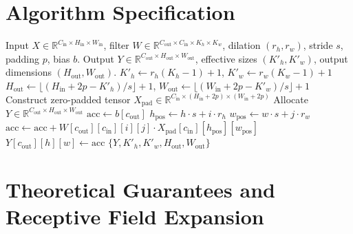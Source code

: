 \documentclass[11pt,a4paper]{article}
\theoremstyle{definition}
\begin{document}
\section{Algorithm Specification}

\begin{algorithm}[H]
\caption{Dilated (Atrous) 2D Convolution Forward Pass}
\label{alg:dilated_conv}
\begin{algorithmic}[1]
\Require Input $X \in \mathbb{R}^{C_{\text{in}} \times H_{\text{in}} \times W_{\text{in}}}$, filter $W \in \mathbb{R}^{C_{\text{out}} \times C_{\text{in}} \times K_h \times K_w}$, dilation $(r_h, r_w)$, stride $s$, padding $p$, bias $b$.
\Ensure Output $Y \in \mathbb{R}^{C_{\text{out}} \times H_{\text{out}} \times W_{\text{out}}}$, effective sizes $(K'_h, K'_w)$, output dimensions $(H_{\text{out}}, W_{\text{out}})$.
\State $K'_h \gets r_h(K_h - 1) + 1$, $K'_w \gets r_w(K_w - 1) + 1$
\State $H_{\text{out}} \gets \lfloor (H_{\text{in}} + 2p - K'_h) / s \rfloor + 1$, $W_{\text{out}} \gets \lfloor (W_{\text{in}} + 2p - K'_w) / s \rfloor + 1$
\State Construct zero-padded tensor $X_{\text{pad}} \in \mathbb{R}^{C_{\text{in}} \times (H_{\text{in}}+2p) \times (W_{\text{in}}+2p)}$
\State Allocate $Y \in \mathbb{R}^{C_{\text{out}} \times H_{\text{out}} \times W_{\text{out}}}$
            \State $\text{acc} \gets b[c_{\text{out}}]$
                    \State $h_{\text{pos}} \gets h \cdot s + i \cdot r_h$
                        \State $w_{\text{pos}} \gets w \cdot s + j \cdot r_w$
                        \State $\text{acc} \gets \text{acc} + W[c_{\text{out}}][c_{\text{in}}][i][j] \cdot X_{\text{pad}}[c_{\text{in}}][h_{\text{pos}}][w_{\text{pos}}]$
                    \EndFor
                \EndFor
            \EndFor
            \State $Y[c_{\text{out}}][h][w] \gets \text{acc}$
        \EndFor
    \EndFor
\EndFor
\State \Return $\{Y, K'_h, K'_w, H_{\text{out}}, W_{\text{out}}\}$
\end{algorithmic}
\end{algorithm}

\section{Theoretical Guarantees and Receptive Field Expansion}
\end{document}
